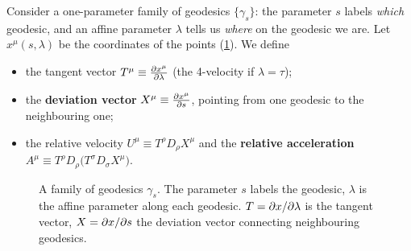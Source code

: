 Consider a one-parameter family of geodesics $\{\gamma_s\}$: the parameter $s$ labels \emph{which} geodesic, and an affine parameter $\lambda$ tells us \emph{where} on the geodesic we are. Let $x^\mu(s,\lambda)$ be the coordinates of the points (\cref{fig:deviation}). We define
\begin{itemize}[nosep]
  \item the tangent vector $T^\mu\equiv\frac{\partial x^\mu}{\partial\lambda}$ (the 4-velocity if $\lambda=\tau$);
  \item the \textbf{deviation vector} $X^\mu\equiv\frac{\partial x^\mu}{\partial s}$, pointing from one geodesic to the neighbouring one;
  \item the relative velocity $U^\mu\equiv T^\rho D_\rho X^\mu$ and the \textbf{relative acceleration} $A^\mu\equiv T^\rho D_\rho\big(T^\sigma D_\sigma X^\mu\big)$.
\end{itemize}

\begin{figure}[ht]
\centering
{}
\caption{A family of geodesics $\gamma_s$. The parameter $s$ labels the geodesic, $\lambda$ is the affine parameter along each geodesic. $T=\partial x/\partial\lambda$ is the tangent vector, $X=\partial x/\partial s$ the deviation vector connecting neighbouring geodesics.}
\label{fig:deviation}
\end{figure}

